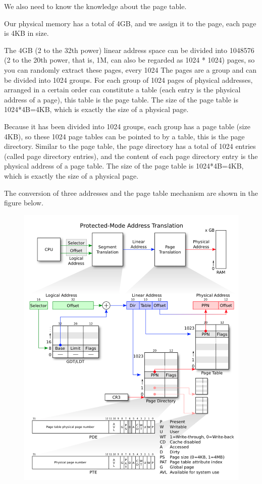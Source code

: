 We also need to know the knowledge about the page table.

Our physical memory has a total of 4GB, and we assign it to the page, each page is 4KB in size.

The 4GB (2 to the 32th power) linear address space can be divided into 1048576 (2 to the 20th power, that is, 1M, can also be regarded as 1024 * 1024) pages, so you can randomly extract these pages, every 1024 The pages are a group and can be divided into 1024 groups. For each group of 1024 pages of physical addresses, arranged in a certain order can constitute a table (each entry is the physical address of a page), this table is the page table. The size of the page table is 1024*4B=4KB, which is exactly the size of a physical page.

Because it has been divided into 1024 groups, each group has a page table (size 4KB), so these 1024 page tables can be pointed to by a table, this is the page directory. Similar to the page table, the page directory has a total of 1024 entries (called page directory entries), and the content of each page directory entry is the physical address of a page table. The size of the page table is 1024*4B=4KB, which is exactly the size of a physical page.

The conversion of three addresses and the page table mechanism are shown in the figure below.
\begin{figure}[H]
\centering
\includegraphics[width=0.8\linewidth]{figure/address_transform}
\end{figure}


